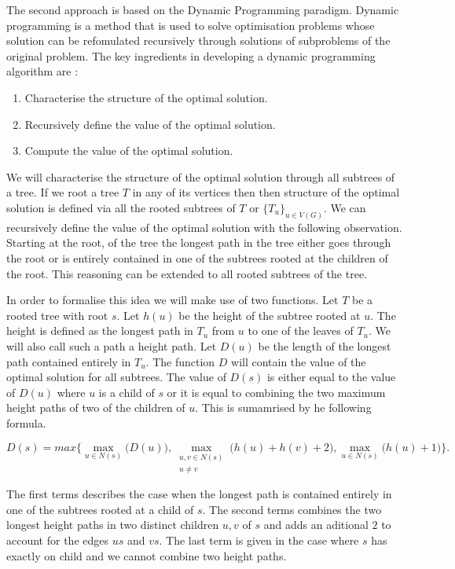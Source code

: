 The second approach is based on the Dynamic Programming paradigm. Dynamic programming is a method that is used to solve optimisation problems whose solution can be refomulated recursively through solutions of subproblems of the original problem. The key ingredients in developing a dynamic programming algorithm are \cite{intro-to-algo}:

\begin{enumerate}
    \item Characterise the structure of the optimal solution.
    \item Recursively define the value of the optimal solution.
    \item Compute the value of the optimal solution.
\end{enumerate}


We will characterise the structure of the optimal solution through all subtrees of a tree. If we root a tree $T$ in any of its vertices then then structure of the optimal solution is defined via all the rooted subtrees of $T$ or $\{T_u\}_{u \in V(G)}$. We can recursively define the value of the optimal solution with the following observation. Starting at the root, of the tree the longest path in the tree either goes through the root or is entirely contained in one of the subtrees rooted at the children of the root. This reasoning can be extended to all rooted subtrees of the tree.

In order to formalise this idea we will make use of two functions. Let $T$ be a rooted tree with root $s$. Let $h(u)$ be the height of the subtree rooted at $u$. The height is defined as the longest path in $T_u$ from $u$ to one of the leaves of $T_u$. We will also call such a path a height path. Let $D(u)$ be the length of the longest path contained entirely in $T_u$. The function $D$ will contain the value of the optimal solution for all subtrees. The value of $D(s)$ is either equal to the value of $D(u)$ where $u$ is a child of $s$ or it is equal to combining the two maximum height paths of two of the children of $u$. This is sumamrised by he following formula.

$$ D(s) = max\bigg\{ \max\limits_{u \in N(s)}\bigg(D(u)\bigg), \max\limits_{\substack{u, v \in N(s) \\ u \ne v}} \bigg(h(u) + h(v) + 2\bigg) , \max\limits_{u \in N(s)}\bigg(h(u) + 1 \bigg)   \bigg\}. $$

The first terms describes the case when the longest path is contained entirely in one of the subtrees rooted at a child of $s$. The second terms combines the two longest height paths in two distinct children $u, v$ of $s$ and adds an aditional $2$ to account for the edges $us$ and $vs$. The last term is given in the case where $s$ has exactly on child and we cannot combine two height paths.

